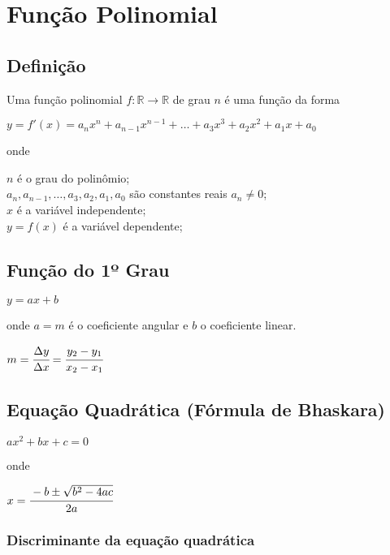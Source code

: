 \section{Função Polinomial}

	\subsection{Definição}
	
	Uma função polinomial $ f : \mathbb{R} \rightarrow \mathbb{R} $ de grau $ n $ é uma função da forma
	
	\bigskip
	
	{\Large $ y = f'(x) = a_{n} x^{n} + a_{n-1} x^{n-1} + \dots + a_{3} x^{3} + a_{2} x^{2} + a_{1} x + a_{0} $}
	
	\bigskip
	
	onde
	
	$ n $ é o grau do polinômio; \\
	$ a_{n}, a_{n-1}, \dots , a_{3}, a_{2}, a_{1}, a_{0} $ são constantes reais $ a_{n} \neq 0 $; \\
	$ x $ é a variável independente; \\
	$ y = f(x) $ é a variável dependente;
	
	\subsection{Função do 1º Grau}
	
	{\Large $ y = ax + b $}
	
	\bigskip
	
	onde $ a = m $ é o coeficiente angular e $ b $ o coeficiente linear.
	
	\bigskip
	
	{\Large $ m = \cfrac{\Delta y}{\Delta x} = \cfrac{y_2 - y_1}{x_2 - x_1}$}
	
	
	\subsection{Equação Quadrática (Fórmula de Bhaskara)}
	
	{\Large $ ax^{2} + bx + c = 0 $}
	
	\bigskip
	
	onde
	
	\bigskip
	
	{\Large $ x = \cfrac {-b \pm \sqrt {b^2 - 4ac}} {2a} $}

		\subsubsection{Discriminante da equação quadrática}
	
